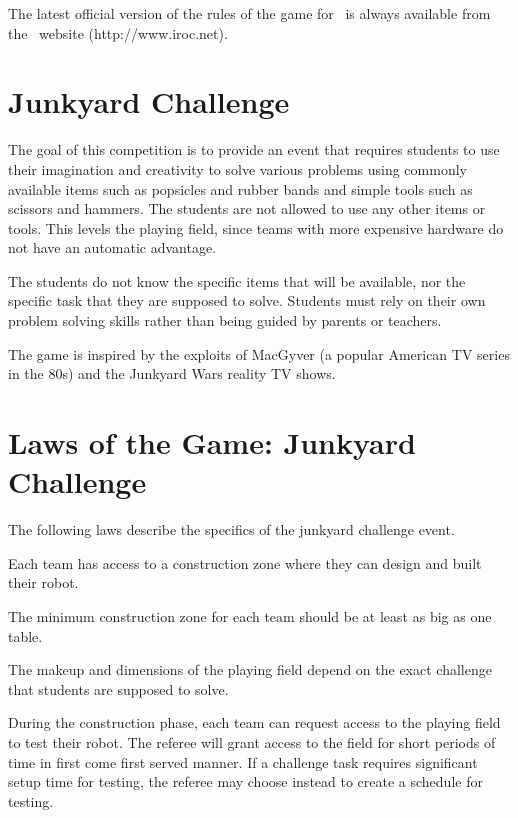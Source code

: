 \documentclass[12pt]{hurocup}
\begin{document}
The latest official version of the rules of the game for \IROC\ is
always available from the \IROC\ website (http://www.iroc.net).

\section{Junkyard Challenge}
\label{sec:junkyard-challenge} 

The goal of this competition is to provide an event that requires
students to use their imagination and creativity to solve various
problems using commonly available items such as popsicles and rubber
bands and simple tools such as scissors and hammers. The students are
not allowed to use any other items or tools. This levels the playing
field, since teams with more expensive hardware do not have an
automatic advantage.

The students do not know the specific items that will be available,
nor the specific task that they are supposed to solve. Students must
rely on their own problem solving skills rather than being guided by
parents or teachers.

The game is inspired by the exploits of MacGyver (a popular American TV
series in the 80s) and the Junkyard Wars reality TV shows.

\section{Laws of the Game: Junkyard Challenge}
\label{sec:laws-junkyard-challenge}

The following laws describe the specifics of the junkyard challenge
event.

\label{jc-team}

\begin{lawlist}[JC]

\item Each team has access to a construction zone where they can
  design and built their robot. 

\item The minimum construction zone for each team should be at least
  as big as one table.

\end{lawlist}

\label{lc-field}

\begin{lawlist}[JC]

\item The makeup and dimensions of the playing field depend on the
  exact challenge that students are supposed to solve.

\item During the construction phase, each team can request access to
  the playing field to test their robot. The referee will grant access
  to the field for short periods of time in first come first served
  manner. If a challenge task requires significant setup time for
  testing, the referee may choose instead to create a schedule for
  testing.

\end{lawlist}
\end{document}
